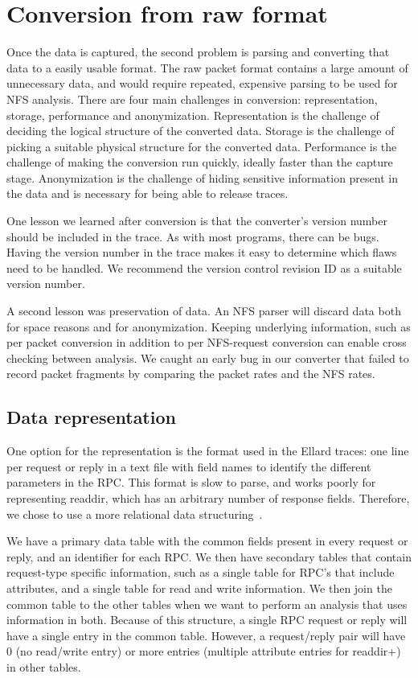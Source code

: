 \section{Conversion from raw format}
\label{sec:conversion}

Once the data is captured, the second problem is parsing and
converting that data to a easily usable format.  The raw packet format
contains a large amount of unnecessary data, and would require
repeated, expensive parsing to be used for NFS analysis.  There are four main
challenges in conversion: representation, storage, performance and
anonymization.  Representation is the challenge of deciding the
logical structure of the converted data.  Storage is the challenge of
picking a suitable physical structure for the converted data.
Performance is the challenge of making the conversion run quickly,
ideally faster than the capture stage.  Anonymization is the
challenge of hiding sensitive information present in the data and is
necessary for being able to release traces.

One lesson we learned after conversion is that the converter's version
number should be included in the trace.  As with most programs, there
can be bugs.  Having the version number in the trace makes it easy to
determine which flaws need to be handled.  We recommend the version
control revision ID as a suitable version number.  

A second lesson was
preservation of data.  An NFS parser will discard data both for space
reasons and for anonymization.  Keeping underlying information, such as
per packet conversion in addition to per NFS-request conversion can
enable cross checking between analysis.  We caught an early bug in our
converter that failed to record packet fragments by comparing the
packet rates and the NFS rates.  

\subsection{Data representation}

One option for the representation is the format used in the
Ellard\cite{ellardTraces} traces: one line per request or reply in a text
file with field names to identify the different parameters in the RPC.
This format is slow to parse, and works poorly for representing 
readdir, which has an arbitrary number of response fields.
Therefore, we chose to use a more relational data
structuring~\cite{codd70relational}.  

We have a primary data table with the common fields present in every
request or reply, and an identifier for each RPC.  We then have
secondary tables that contain request-type specific information, such
as a single table for RPC's that include attributes, and a single
table for read and write information.  We then join the common table
to the other tables when we want to perform an analysis that uses
information in both.  Because of this structure, a single RPC request
or reply will have a single entry in the common table.  However, a
request/reply pair will have 0 (no read/write entry) or more
entries (multiple attribute entries for readdir+) in other tables.

